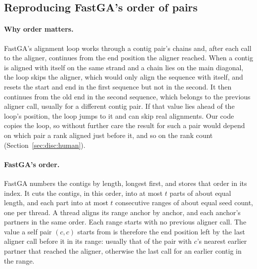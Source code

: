 \subsection{Reproducing FastGA's order of pairs}\label{sec:impl:order}

\paragraph{Why order matters.} FastGA's alignment loop works through a
contig pair's chains and, after each call to the aligner, continues from
the end position the aligner reached. When a contig is aligned with itself
on the same strand and a chain lies on the main diagonal, the loop skips
the aligner, which would only align the sequence with itself, and resets
the start and end in the first sequence but not in the second. It then
continues from the old end in the second sequence, which belongs to the
previous aligner call, usually for a different contig pair. If that value
lies ahead of the loop's position, the loop jumps to it and can skip real
alignments. Our code copies the loop, so without further care the result
for such a pair would depend on which pair a rank aligned just before it,
and so on the rank count (Section~\ref{sec:disc:human}).

\paragraph{FastGA's order.} FastGA numbers the contigs by length, longest
first, and stores that order in its index. It cuts the contigs, in this
order, into at most $t$ parts of about equal length, and each part into at
most $t$ consecutive ranges of about equal seed count, one per thread. A
thread aligns its range anchor by anchor, and each anchor's partners in the
same order. Each range starts with no previous aligner call. The value a
self pair $(c,c)$ starts from is therefore the end position left by the
last aligner call before it in its range: usually that of the pair with
$c$'s nearest earlier partner that reached the aligner, otherwise the last
call for an earlier contig in the range.


